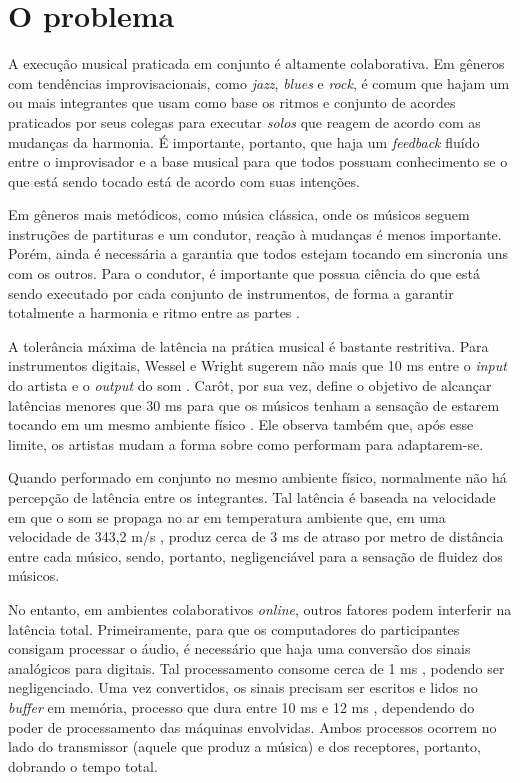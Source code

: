 \section{O problema}
\label{sec:problem}

A execução musical praticada em conjunto é altamente colaborativa. Em gêneros com tendências improvisacionais, como \textit{jazz}, \textit{blues} e \textit{rock}, é comum que hajam um ou mais integrantes que usam como base os ritmos e conjunto de acordes praticados por seus colegas para executar \textit{solos} que reagem de acordo com as mudanças da harmonia. É importante, portanto, que haja um \textit{feedback} fluído entre o improvisador e a base musical para que todos possuam conhecimento se o que está sendo tocado está de acordo com suas intenções.

Em gêneros mais metódicos, como música clássica, onde os músicos seguem instruções de partituras e um condutor, reação à mudanças é menos importante. Porém, ainda é necessária a garantia que todos estejam tocando em sincronia uns com os outros. Para o condutor, é importante que possua ciência do que está sendo executado por cada conjunto de instrumentos, de forma a garantir totalmente a harmonia e ritmo entre as partes \cite{conductor_role}.

A tolerância máxima de latência na prática musical é bastante restritiva. Para instrumentos digitais, Wessel e Wright sugerem não mais que 10 ms entre o \textit{input} do artista e o \textit{output} do som \cite{digital_instrument_latency}. Carôt, por sua vez, define o objetivo de alcançar latências menores que 30 ms para que os músicos tenham a sensação de estarem tocando em um mesmo ambiente físico \cite{carot_low_latency}. Ele observa também que, após esse limite, os artistas mudam a forma sobre como performam para adaptarem-se.

Quando performado em conjunto no mesmo ambiente físico, normalmente não há percepção de latência entre os integrantes. Tal latência é baseada na velocidade em que o som se propaga no ar em temperatura ambiente que, em uma velocidade de 343,2 m/s \cite{speed_of_sound}, produz cerca de 3 ms de atraso por metro de distância entre cada músico, sendo, portanto, negligenciável para a sensação de fluidez dos músicos.

No entanto, em ambientes colaborativos \textit{online}, outros fatores podem interferir na latência total. Primeiramente, para que os computadores do participantes consigam processar o áudio, é necessário que haja uma conversão dos sinais analógicos para digitais. Tal processamento consome cerca de 1 ms \cite{how_low_can_you_go}, podendo ser negligenciado. Uma vez convertidos, os sinais precisam ser escritos e lidos no \textit{buffer} em memória, processo que dura entre 10 ms e 12 ms \cite{how_low_can_you_go}, dependendo do poder de processamento das máquinas envolvidas. Ambos processos ocorrem no lado do transmissor (aquele que produz a música) e dos receptores, portanto, dobrando o tempo total.

